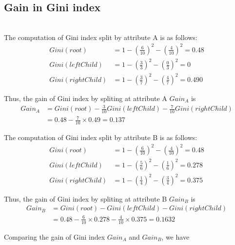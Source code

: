 \documentclass[11pt,a4paper]{article}
\begin{document}
\newpage
\subsection{Gain in Gini index} 

\\

The computation of Gini index split by attribute A is as follows:
\begin{align*}
    Gini(root) &= 1 - (\frac{6}{10})^2 - (\frac{4}{10})^2 = 0.48 \\
    Gini(leftChild) &= 1 - (\frac{3}{3})^2 - (\frac{0}{3})^2 = 0 \\
    Gini(rightChild) &= 1 - (\frac{3}{7})^2 - (\frac{4}{7})^2 = 0.490 
 \end{align*}

 Thus, the gain of Gini index by spliting at attribute A $Gain_A$ is 
\begin{align*}
    Gain_A &= Gini(root) - \frac{3}{10} Gini(leftChild) - \frac{7}{10}Gini(rightChild) \\
           &= 0.48 - \frac{7}{10} \times 0.49  = 0.137
 \end{align*}

The computation of Gini index split by attribute B is as follows:
\begin{align*}
    Gini(root) &= 1 - (\frac{6}{10})^2 - (\frac{4}{10})^2 = 0.48 \\
    Gini(leftChild) &= 1 - (\frac{5}{6})^2 - (\frac{1}{6})^2 = 0.278 \\
    Gini(rightChild) &= 1 - (\frac{1}{4})^2 - (\frac{3}{4})^2 = 0.375 
 \end{align*}

 Thus, the gain of Gini index by spliting at attribute B $Gain_B$ is 
\begin{align*}
    Gain_B &= Gini(root) - Gini(leftChild) - Gini(rightChild) \\
           &= 0.48 - \frac{6}{10} \times 0.278 - \frac{4}{10} \times 0.375 =
    0.1632
 \end{align*}

  Comparing the gain of Gini index $Gain_A$ and $Gain_B$, we have
\end{document}
